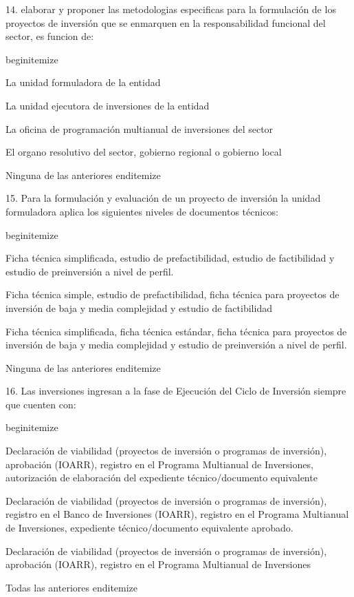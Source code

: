 14. elaborar y proponer las metodologias especificas para la formulación de los proyectos de inversión que se enmarquen en la responsabilidad funcional del sector, es funcion de:

begin{itemize}
			\item La unidad formuladora de la entidad
 			\item La unidad ejecutora de inversiones de la entidad
			\item La oficina de programación multianual de inversiones del sector
			\item El organo resolutivo del sector, gobierno regional o gobierno local
			\item Ninguna de las anteriores 
end{itemize}

15. Para la formulación y evaluación de un proyecto de inversión la unidad formuladora aplica los siguientes niveles de documentos técnicos:  

begin{itemize}
			\item Ficha técnica simplificada, estudio de prefactibilidad, estudio de factibilidad y estudio de preinversión a nivel de perfil.
 			\item Ficha técnica simple, estudio de prefactibilidad, ficha técnica para proyectos de inversión de baja y media complejidad y estudio de factibilidad
			\item Ficha técnica simplificada, ficha técnica estándar, ficha técnica para proyectos de inversión de baja y media complejidad y estudio de preinversión a nivel de perfil.
			\item Ninguna de las anteriores
end{itemize}

16. Las inversiones ingresan a la fase de Ejecución del Ciclo de Inversión siempre que cuenten con:

begin{itemize}
			\item Declaración de viabilidad (proyectos de inversión o programas de inversión), aprobación (IOARR), registro en el Programa Multianual de Inversiones, autorización de elaboración del expediente técnico/documento equivalente
 			\item Declaración de viabilidad (proyectos de inversión o programas de inversión), registro en el Banco de Inversiones (IOARR), registro en el Programa Multianual de Inversiones, expediente técnico/documento equivalente aprobado.
			\item Declaración de viabilidad (proyectos de inversión o programas de inversión), aprobación (IOARR), registro en el Programa Multianual de Inversiones
			\item Todas las anteriores
end{itemize}

